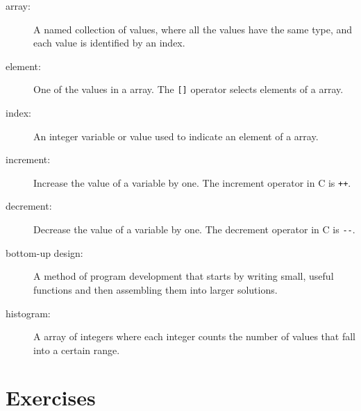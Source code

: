 \begin{description}

\item[array:]  A named collection of values, where all the
values have the same type, and each value is identified by
an index.

\item[element:]  One of the values in a array.  The {\tt []}
operator selects elements of a array.

\item[index:]  An integer variable or value used to indicate
an element of a array.

\item[increment:]  Increase the value of a variable by one.
The increment operator in C is {\tt ++}. 

\item[decrement:]  Decrease the value of a variable by one.
The decrement operator in C is {\tt -}{\tt -}.

\item[bottom-up design:]  A method of program development that
starts by writing small, useful functions and then assembling
them into larger solutions.

\item[histogram:]  A array of integers where each integer
counts the number of values that fall into a certain range.


\end{description}

\section{Exercises}
\setcounter{exercisenum}{0}





